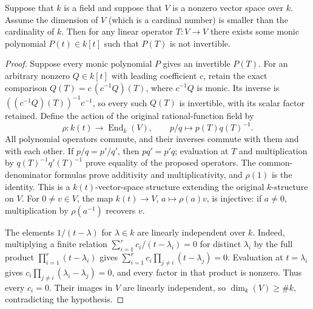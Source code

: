 \begin{lemma}
\label{editorial-source-lemma-dimension}
Suppose that $k$ is a field and suppose that $V$ is a nonzero vector
space over $k$. Assume the dimension of $V$ (which is a cardinal number)
is smaller than the cardinality of $k$. Then for any linear operator
$T : V \to V$ there exists some monic polynomial $P(t) \in k[t]$ such that
$P(T)$ is not invertible.
\end{lemma}

\begin{proof}
Suppose every monic polynomial $P$ gives an invertible $P(T)$.
For an arbitrary nonzero $Q\in k[t]$ with leading coefficient $c$,
retain the exact comparison
$Q(T)=c\,(c^{-1}Q)(T)$, where $c^{-1}Q$ is monic.
Its inverse is $((c^{-1}Q)(T))^{-1}c^{-1}$, so every such $Q(T)$
is invertible, with its scalar factor retained.
Define the action of the original rational-function field by
$$
\rho:k(t)\longrightarrow\operatorname{End}_k(V),\qquad
p/q\longmapsto p(T)q(T)^{-1}.
$$
All polynomial operators commute, and their inverses commute with
them and with each other. If $p/q=p'/q'$, then $pq'=p'q$;
evaluation at $T$ and multiplication by $q(T)^{-1}q'(T)^{-1}$
prove equality of the proposed operators. The common-denominator
formulas prove additivity and multiplicativity, and $\rho(1)$ is
the identity. This is a $k(t)$-vector-space structure extending
the original $k$-structure on $V$. For $0\ne v\in V$, the map
$k(t)\to V$, $a\mapsto\rho(a)v$, is injective: if $a\ne0$,
multiplication by $\rho(a^{-1})$ recovers $v$.

\medskip\noindent
The elements $1/(t-\lambda)$ for $\lambda\in k$ are linearly
independent over $k$. Indeed, multiplying a finite relation
$\sum_{i=1}^r c_i/(t-\lambda_i)=0$ for distinct $\lambda_i$ by
the full product $\prod_{i=1}^r(t-\lambda_i)$ gives
$\sum_{i=1}^r c_i\prod_{j\ne i}(t-\lambda_j)=0$.
Evaluation at $t=\lambda_i$ gives
$c_i\prod_{j\ne i}(\lambda_i-\lambda_j)=0$, and every factor
in that product is nonzero. Thus every $c_i=0$.
Their images in $V$ are linearly independent, so
$\dim_k(V)\geq\#k$, contradicting the hypothesis.
\end{proof}